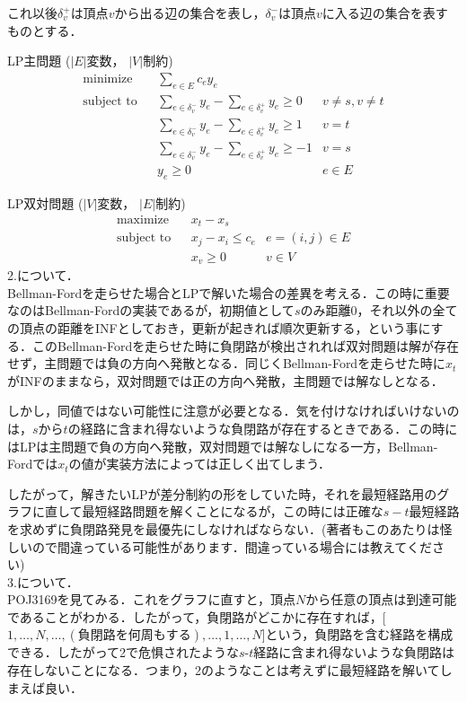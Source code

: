 \documentclass[13pt]{jarticle}
\theoremstyle{nonitalic} %
\begin{document}
これ以後$\delta_{v}^+$は頂点$v$から出る辺の集合を表し，$\delta_{v}^-$は頂点$v$に入る辺の集合を表すものとする．

LP主問題
($|E|$変数， $|V|$制約)
\begin{align}
 &&&&&\textrm{minimize}   && \sum_{e  \in E} c_e y_e \\
 &&&&&\textrm{subject to} && \sum_{e \in \delta_v^- } y_e - \sum_{e \in \delta_v^+} y_e \geq 0 & v\neq s, v\neq t  &&&&&\\
 &&&&&                    && \sum_{e \in \delta_v^- } y_e - \sum_{e \in \delta_v^+} y_e \geq 1 & v = t  &&&&&\\
 &&&&&                    && \sum_{e \in \delta_v^- } y_e - \sum_{e \in \delta_v^+} y_e \geq -1 & v = s  &&&&&\\
 &&&&&                    &&  y_e \geq 0 & e \in E&&&&&
\end{align}

LP双対問題
($|V|$変数， $|E|$制約)
\begin{align}
 &&&&&\textrm{maximize}   && x_t - x_s \\
 &&&&&\textrm{subject to} && x_j - x_i\leq c_e & e = (i,j) \in E  &&&&&\\
 &&&&&                    && x_v \geq 0 & v \in V &&&&&
\end{align}
2.について．\\
 Bellman-Fordを走らせた場合とLPで解いた場合の差異を考える．この時に重要なのはBellman-Fordの実装であるが，初期値として$s$のみ距離$0$，それ以外の全ての頂点の距離をINFとしておき，更新が起きれば順次更新する，という事にする．このBellman-Fordを走らせた時に負閉路が検出されれば双対問題は解が存在せず，主問題では負の方向へ発散となる．同じくBellman-Fordを走らせた時に$x_t$がINFのままなら，双対問題では正の方向へ発散，主問題では解なしとなる．

しかし，同値ではない可能性に注意が必要となる．気を付けなければいけないのは，$s$から$t$の経路に含まれ得ないような負閉路が存在するときである．この時にはLPは主問題で負の方向へ発散，双対問題では解なしになる一方，Bellman-Fordでは$x_t$の値が実装方法によっては正しく出てしまう．

したがって，解きたいLPが差分制約の形をしていた時，それを最短経路用のグラフに直して最短経路問題を解くことになるが，この時には正確な$s-t$最短経路を求めずに負閉路発見を最優先にしなければならない．(著者もこのあたりは怪しいので間違っている可能性があります．間違っている場合には教えてください)\\

3.について．\\
POJ3169を見てみる．これをグラフに直すと，頂点$N$から任意の頂点は到達可能であることがわかる．したがって，負閉路がどこかに存在すれば，[$1, \dots ,N,\dots, ( \textrm{負閉路を何周もする} ),\dots ,1, \dots, N$]という，負閉路を含む経路を構成できる．したがって2で危惧されたような$s$-$t$経路に含まれ得ないような負閉路は存在しないことになる．つまり，2のようなことは考えずに最短経路を解いてしまえば良い．
\end{document}
